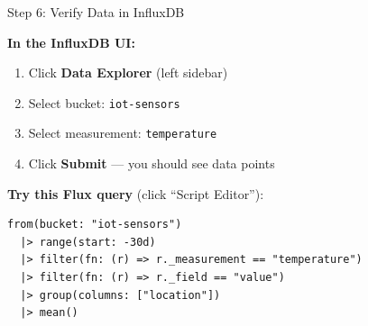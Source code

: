 \documentclass[aspectratio=169,11pt]{beamer}
\begin{document}
\begin{frame}[fragile]{Step 6: Verify Data in InfluxDB}

    \vspace{0.3cm}
    \textbf{In the InfluxDB UI:}
    \begin{enumerate}
        \item Click \textbf{Data Explorer} (left sidebar)
        \item Select bucket: \texttt{iot-sensors}
        \item Select measurement: \texttt{temperature}
        \item Click \textbf{Submit} --- you should see data points
    \end{enumerate}

    \vspace{0.2cm}
    \textbf{Try this Flux query} (click ``Script Editor''):
\begin{lstlisting}
from(bucket: "iot-sensors")
  |> range(start: -30d)
  |> filter(fn: (r) => r._measurement == "temperature")
  |> filter(fn: (r) => r._field == "value")
  |> group(columns: ["location"])
  |> mean()
\end{lstlisting}

    \vspace{0.1cm}
\end{frame}
\end{document}
